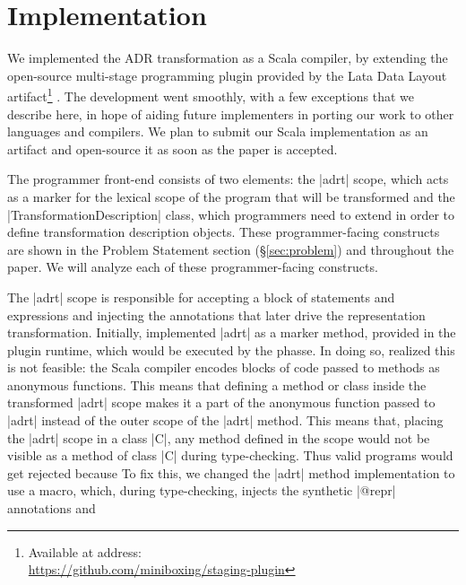 \section{Implementation}
\label{sec:impl}

We implemented the ADR transformation as a Scala compiler, by extending the open-source multi-stage programming plugin provided by the Lata Data Layout artifact\footnote{Available at address:\\ \url{https://github.com/miniboxing/staging-plugin}} \cite{ldl}. The development went smoothly, with a few exceptions that we describe here, in hope of aiding future implementers in porting our work to other languages and compilers. We plan to submit our Scala implementation as an artifact and open-source it as soon as the paper is accepted.

The programmer front-end consists of two elements: the |adrt| scope, which acts as a marker for the lexical scope of the program that will be transformed and the |TransformationDescription| class, which programmers need to extend in order to define transformation description objects. These programmer-facing constructs are shown in the Problem Statement section (\S\ref{sec:problem}) and throughout the paper. We will analyze each of these programmer-facing constructs.

The |adrt| scope is responsible for accepting a block of statements and expressions and injecting the annotations that later drive the representation transformation. Initially, implemented |adrt| as a marker method, provided in the plugin runtime, which would be executed by the \inject{} phasse. In doing so, realized this is not feasible: the Scala compiler encodes blocks of code passed to methods as anonymous functions. This means that defining a method or class inside the transformed |adrt| scope makes it a part of the anonymous function passed to |adrt| instead of the outer scope of the |adrt| method. This means that, placing the |adrt| scope in a class |C|, any method defined in the scope would not be visible as a method of class |C| during type-checking. Thus valid programs would get rejected because  To fix this, we changed the |adrt| method implementation to use a macro, which, during type-checking, injects the synthetic |@repr| annotations and

